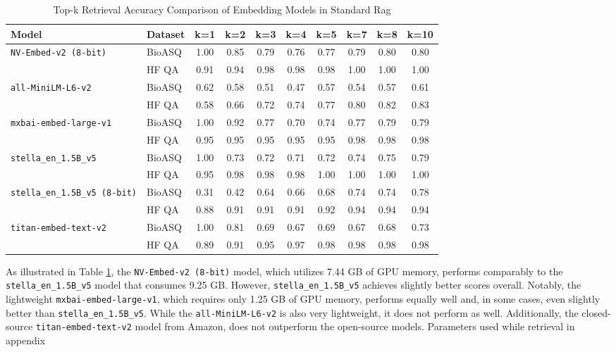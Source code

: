 \documentclass{scrartcl}
\begin{document}
\begin{table}[H]
\centering
\small
\begin{tabular}{l l c c c c c c c c}
\hline
\textbf{Model} & \textbf{Dataset} & \textbf{k=1} & \textbf{k=2} & \textbf{k=3} & \textbf{k=4} & \textbf{k=5} & \textbf{k=7} & \textbf{k=8} & \textbf{k=10} \\
\hline
\multirow{2}{*}{\texttt{NV-Embed-v2 (8-bit)}} 
 & BioASQ & 1.00 & 0.85 & 0.79 & 0.76 & 0.77 & 0.79 & 0.80 & 0.80 \\
 & HF QA  & 0.91 & 0.94 & 0.98 & 0.98 & 0.98 & 1.00 & 1.00 & 1.00 \\
\hline
\multirow{2}{*}{\texttt{all-MiniLM-L6-v2}} 
 & BioASQ & 0.62 & 0.58 & 0.51 & 0.47 & 0.57 & 0.54 & 0.57 & 0.61 \\
 & HF QA  & 0.58 & 0.66 & 0.72 & 0.74 & 0.77 & 0.80 & 0.82 & 0.83 \\
\hline
\multirow{2}{*}{\texttt{mxbai-embed-large-v1}} 
 & BioASQ & 1.00 & 0.92 & 0.77 & 0.70 & 0.74 & 0.77 & 0.79 & 0.79 \\
 & HF QA  & 0.95 & 0.95 & 0.95 & 0.95 & 0.95 & 0.98 & 0.98 & 0.98 \\
\hline
\multirow{2}{*}{\texttt{stella\_en\_1.5B\_v5}} 
 & BioASQ & 1.00 & 0.73 & 0.72 & 0.71 & 0.72 & 0.74 & 0.75 & 0.79 \\
 & HF QA  & 0.95 & 0.98 & 0.98 & 0.98 & 1.00 & 1.00 & 1.00 & 1.00 \\
\hline
\multirow{2}{*}{\texttt{stella\_en\_1.5B\_v5 (8-bit)}} 
 & BioASQ & 0.31 & 0.42 & 0.64 & 0.66 & 0.68 & 0.74 & 0.74 & 0.78 \\
 & HF QA  & 0.88 & 0.91 & 0.91 & 0.91 & 0.92 & 0.94 & 0.94 & 0.94 \\
\hline
\multirow{2}{*}{\texttt{titan-embed-text-v2}} 
 & BioASQ & 1.00 & 0.81 & 0.69 & 0.67 & 0.69 & 0.67 & 0.68 & 0.73 \\
 & HF QA  & 0.89 & 0.91 & 0.95 & 0.97 & 0.98 & 0.98 & 0.98 & 0.98 \\
\hline
\end{tabular}
\caption{Top-k Retrieval Accuracy Comparison of Embedding Models in Standard Rag}
\label{table:top_k_retrieval_accuracy_table}
\end{table}

As illustrated in Table  \ref{table:top_k_retrieval_accuracy_table}, the \texttt{NV-Embed-v2 (8-bit)} model, which utilizes 7.44 GB of GPU memory, performs comparably to the \texttt{stella\_en\_1.5B\_v5} model that consumes 9.25 GB. However, \texttt{stella\_en\_1.5B\_v5} achieves slightly better scores overall. Notably, the lightweight \texttt{mxbai-embed-large-v1}, which requires only 1.25 GB of GPU memory, performs equally well and, in some cases, even slightly better than \texttt{stella\_en\_1.5B\_v5}. While the \texttt{all-MiniLM-L6-v2} is also very lightweight, it does not perform as well. Additionally, the closed-source \texttt{titan-embed-text-v2} model from Amazon, does not outperform the open-source models. Parameters used while retrieval in appendix
\end{document}
